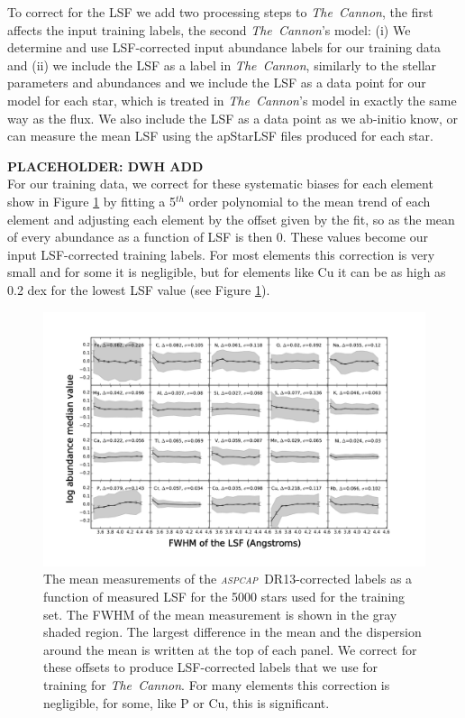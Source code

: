 \documentclass[14pt, preprint2]{aastex6}
\newcommand{\project}[1]{\textsl{#1}}
\newcommand{\tc}{\project{The~Cannon}}
\newcommand{\aspcap}{\project{\textsc{aspcap}}}
\begin{document}
To correct for the LSF we add two processing steps to \tc,  the first affects the input training labels, the second \tc's model: (i) We determine and use LSF-corrected input abundance labels for our training data and (ii) we include the LSF as a label in \tc, similarly to the stellar parameters and abundances and we include the LSF as a data point for our model for each star, which is treated in \tc's model in exactly the same way as the flux.  We also include the LSF as a data point as we ab-initio know, or can measure the mean LSF using the apStarLSF files produced for each star. 

\textbf{PLACEHOLDER: DWH ADD} \\

For our training data, we correct for these systematic biases for each element show in Figure \ref{fig:training} by fitting a 5$^{th}$ order polynomial to the mean trend of each element and adjusting each element by the offset given by the fit, so as the mean of every abundance as a function of LSF is then 0. These values become our input LSF-corrected training labels.  For most elements this correction is very small and for some it is negligible, but for elements like Cu it can be as high as 0.2 dex for the lowest LSF value (see Figure \ref{fig:training}). 

\begin{figure}[]
\includegraphics[scale=0.6]{training_input.pdf} 
  \caption{The mean measurements of the \aspcap\ DR13-corrected labels as a function of measured LSF for the 5000 stars used for the training set. The FWHM of the mean measurement is shown in the gray shaded region. The largest difference in the mean and the dispersion around the mean is written at the top of each panel. We correct for these offsets to produce LSF-corrected labels that we use for training for \tc. For many elements this correction is negligible, for some, like P or Cu, this is significant.  }
\label{fig:training}
\end{figure}
\end{document}

